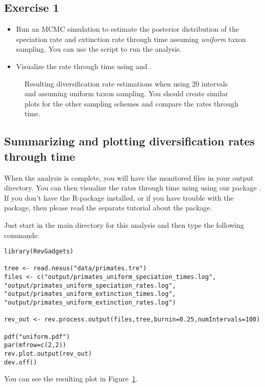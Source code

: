 \subsection{Exercise 1}

\begin{itemize}
\item Run an MCMC simulation to estimate the posterior distribution of the speciation rate and extinction rate through time assuming \emph{uniform} taxon sampling. You can use the script  to run the analysis.
\item Visualize the rate through time using \R and \RevGadgets.
\end{itemize}

\begin{figure}[h!]
\centering
{}
\caption{\small Resulting diversification rate estimations when using 20 intervals and assuming uniform taxon sampling. You should create similar plots for the other sampling schemes and compare the rates through time.}
\label{fig:EBD_Results}
\end{figure}

\subsection{Summarizing and plotting diversification rates through time}
When the analysis is complete, you will have the monitored files in your output directory.
You can then visualize the rates through time using \R using our package \RevGadgets.
If you don't have the R-package \RevGadgets installed, or if you have trouble with the package, then please read the separate tutorial about the package.

Just start \R in the main directory for this analysis and then type the following commands:
{\tt \begin{snugshade*}
\begin{lstlisting}
library(RevGadgets)

tree <- read.nexus("data/primates.tre")
files <- c("output/primates_uniform_speciation_times.log", "output/primates_uniform_speciation_rates.log", "output/primates_uniform_extinction_times.log", "output/primates_uniform_extinction_rates.log")

rev_out <- rev.process.output(files,tree,burnin=0.25,numIntervals=100)

pdf("uniform.pdf")
par(mfrow=c(2,2))
rev.plot.output(rev_out)
dev.off()
\end{lstlisting}
\end{snugshade*}}
You can see the resulting plot in Figure~\ref{fig:EBD_Results}.


